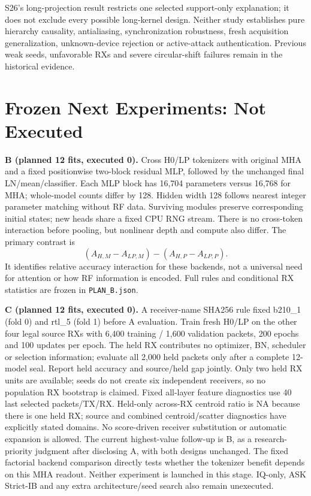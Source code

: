 \documentclass[10pt]{article}
\begin{document}
S26's long-projection result restricts one selected support-only explanation; it does not exclude every possible long-kernel design. Neither study establishes pure hierarchy causality, antialiasing, synchronization robustness, fresh acquisition generalization, unknown-device rejection or active-attack authentication. Previous weak seeds, unfavorable RXs and severe circular-shift failures remain in the historical evidence.

\section{Frozen Next Experiments: Not Executed}
\textbf{B (planned 12 fits, executed 0).} Cross H0/LP tokenizers with original MHA and a fixed positionwise two-block residual MLP, followed by the unchanged final LN/mean/classifier. Each MLP block has 16,704 parameters versus 16,768 for MHA; whole-model counts differ by 128. Hidden width 128 follows nearest integer parameter matching without RF data. Surviving modules preserve corresponding initial states; new heads share a fixed CPU RNG stream. There is no cross-token interaction before pooling, but nonlinear depth and compute also differ. The primary contrast is
\[
(A_{H,M}-A_{LP,M})-(A_{H,P}-A_{LP,P}).
\]
It identifies relative accuracy interaction for these backends, not a universal need for attention or how RF information is encoded. Full rules and conditional RX statistics are frozen in \texttt{PLAN\_B.json}.

\textbf{C (planned 12 fits, executed 0).} A receiver-name SHA256 rule fixed b210\_1 (fold 0) and rtl\_5 (fold 1) before A evaluation. Train fresh H0/LP on the other four legal source RXs with 6,400 training / 1,600 validation packets, 200 epochs and 100 updates per epoch. The held RX contributes no optimizer, BN, scheduler or selection information; evaluate all 2,000 held packets only after a complete 12-model seal. Report held accuracy and source/held gap jointly. Only two held RX units are available; seeds do not create six independent receivers, so no population RX bootstrap is claimed. Fixed all-layer feature diagnostics use 40 last selected packets/TX/RX. Held-only across-RX centroid ratio is NA because there is one held RX; source and combined centroid/scatter diagnostics have explicitly stated domains. No score-driven receiver substitution or automatic expansion is allowed.
The current highest-value follow-up is B, as a research-priority judgment after disclosing A, with both designs unchanged. The fixed factorial backend comparison directly tests whether the tokenizer benefit depends on this MHA readout. Neither experiment is launched in this stage. IQ-only, ASK Strict-IB and any extra architecture/seed search also remain unexecuted.
\end{document}
